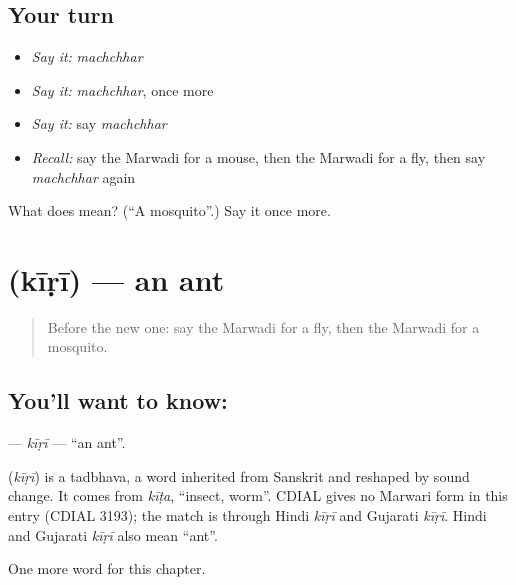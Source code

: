 \subsection*{Your turn}
\begin{itemize}
\raggedright
  \item \emph{Say it:} \emph{machchhar}
  \item \emph{Say it:} \emph{machchhar}, once more
  \item \emph{Say it:} say \emph{machchhar}
  \item \emph{Recall:} say the Marwadi for a mouse, then the Marwadi for a fly, then say \emph{machchhar} again
\end{itemize}

\begin{tcolorbox}[breakable,colback=teal!4,colframe=teal!35!black,title={Before you move on}]
What does  mean? (\textquotedblleft{}A mosquito\textquotedblright{}.) Say it once more.
\end{tcolorbox}
\section[\texorpdfstring{\mw{कीड़ी} (kīṛī)}{कीड़ी (kīṛī)}]{ (kīṛī) — an ant}

\label{lesson:MW-C140-kiri}



\begin{quote}
Before the new one: say the Marwadi for a fly, then the Marwadi for a mosquito.
\end{quote}

\subsection*{You'll want to know: }
\textbf{} — \emph{kīṛī} — \textquotedblleft{}an ant\textquotedblright{}.

\begin{cousinweb}
\textbf{} (\emph{kīṛī}) is a tadbhava, a word inherited from Sanskrit and reshaped by sound change. It comes from \emph{kīṭa}, \textquotedblleft{}insect, worm\textquotedblright{}. CDIAL gives no Marwari form in this entry (CDIAL 3193); the match is through Hindi \emph{kīṛī} and Gujarati \emph{kīṛī}. Hindi and Gujarati \emph{kīṛī} also mean \textquotedblleft{}ant\textquotedblright{}.
\end{cousinweb}

\begin{grammarlens}[title={What you've built}]
One more word for this chapter.
\end{grammarlens}

